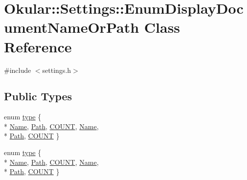 \hypertarget{classOkular_1_1Settings_1_1EnumDisplayDocumentNameOrPath}{\section{Okular\+:\+:Settings\+:\+:Enum\+Display\+Document\+Name\+Or\+Path Class Reference}
\label{classOkular_1_1Settings_1_1EnumDisplayDocumentNameOrPath}
}


{\ttfamily \#include $<$settings.\+h$>$}

\subsection*{Public Types}
\begin{DoxyCompactItemize}
\item 
enum \hyperlink{classOkular_1_1Settings_1_1EnumDisplayDocumentNameOrPath_aef0c62073d68d3c208b9a64de8a08fc3}{type} \{ \\*
\hyperlink{classOkular_1_1Settings_1_1EnumDisplayDocumentNameOrPath_aef0c62073d68d3c208b9a64de8a08fc3a28682097c900a8e648fdc9b4e1fc7d7c}{Name}, 
\hyperlink{classOkular_1_1Settings_1_1EnumDisplayDocumentNameOrPath_aef0c62073d68d3c208b9a64de8a08fc3a032728b5144720076726e9d99e2c9f48}{Path}, 
\hyperlink{classOkular_1_1Settings_1_1EnumDisplayDocumentNameOrPath_aef0c62073d68d3c208b9a64de8a08fc3aba1b32e950d922f3d09b0ce985bdc721}{C\+O\+U\+N\+T}, 
\hyperlink{classOkular_1_1Settings_1_1EnumDisplayDocumentNameOrPath_aef0c62073d68d3c208b9a64de8a08fc3a28682097c900a8e648fdc9b4e1fc7d7c}{Name}, 
\\*
\hyperlink{classOkular_1_1Settings_1_1EnumDisplayDocumentNameOrPath_aef0c62073d68d3c208b9a64de8a08fc3a032728b5144720076726e9d99e2c9f48}{Path}, 
\hyperlink{classOkular_1_1Settings_1_1EnumDisplayDocumentNameOrPath_aef0c62073d68d3c208b9a64de8a08fc3aba1b32e950d922f3d09b0ce985bdc721}{C\+O\+U\+N\+T}
 \}
\item 
enum \hyperlink{classOkular_1_1Settings_1_1EnumDisplayDocumentNameOrPath_aef0c62073d68d3c208b9a64de8a08fc3}{type} \{ \\*
\hyperlink{classOkular_1_1Settings_1_1EnumDisplayDocumentNameOrPath_aef0c62073d68d3c208b9a64de8a08fc3a28682097c900a8e648fdc9b4e1fc7d7c}{Name}, 
\hyperlink{classOkular_1_1Settings_1_1EnumDisplayDocumentNameOrPath_aef0c62073d68d3c208b9a64de8a08fc3a032728b5144720076726e9d99e2c9f48}{Path}, 
\hyperlink{classOkular_1_1Settings_1_1EnumDisplayDocumentNameOrPath_aef0c62073d68d3c208b9a64de8a08fc3aba1b32e950d922f3d09b0ce985bdc721}{C\+O\+U\+N\+T}, 
\hyperlink{classOkular_1_1Settings_1_1EnumDisplayDocumentNameOrPath_aef0c62073d68d3c208b9a64de8a08fc3a28682097c900a8e648fdc9b4e1fc7d7c}{Name}, 
\\*
\hyperlink{classOkular_1_1Settings_1_1EnumDisplayDocumentNameOrPath_aef0c62073d68d3c208b9a64de8a08fc3a032728b5144720076726e9d99e2c9f48}{Path}, 
\hyperlink{classOkular_1_1Settings_1_1EnumDisplayDocumentNameOrPath_aef0c62073d68d3c208b9a64de8a08fc3aba1b32e950d922f3d09b0ce985bdc721}{C\+O\+U\+N\+T}
 \}
\end{DoxyCompactItemize}


